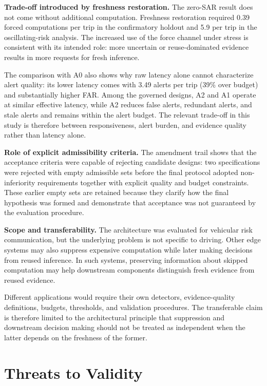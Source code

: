 \documentclass[conference]{IEEEtran}
\begin{document}
\textbf{Trade-off introduced by freshness restoration.}
The zero-SAR result does not come without additional computation.
Freshness restoration required 0.39 forced computations per trip in the
confirmatory holdout and 5.9 per trip in the oscillating-risk analysis.
The increased use of the force channel under stress is consistent with
its intended role: more uncertain or reuse-dominated evidence results in
more requests for fresh inference.

The comparison with A0 also shows why raw latency alone cannot
characterize alert quality: its lower latency comes with 3.49 alerts
per trip (39\% over budget) and substantially higher FAR. Among the
governed designs, A2 and A1
operate at similar effective latency, while A2 reduces false alerts,
redundant alerts, and stale alerts and remains within the alert budget.
The relevant trade-off in this study is therefore between responsiveness,
alert burden, and evidence quality rather than latency alone.

\textbf{Role of explicit admissibility criteria.}
The amendment trail shows that the acceptance criteria were capable of
rejecting candidate designs: two specifications were rejected with
empty admissible sets before the final protocol adopted non-inferiority
requirements together with explicit quality and budget constraints.
These earlier empty sets are retained because they clarify how the
final hypothesis was formed and demonstrate that acceptance was not
guaranteed by the evaluation procedure.

\textbf{Scope and transferability.}
The architecture was evaluated for vehicular risk communication, but the
underlying problem is not specific to driving. Other edge systems may
also suppress expensive computation while later making decisions from
reused inference. In such systems, preserving information about skipped
computation may help downstream components distinguish fresh evidence
from reused evidence.

Different applications would require their own detectors,
evidence-quality definitions, budgets, thresholds, and validation
procedures. The transferable claim
is therefore limited to the architectural principle that suppression and
downstream decision making should not be treated as independent when the
latter depends on the freshness of the former.

\section{Threats to Validity}
\label{sec:threats}
\end{document}
